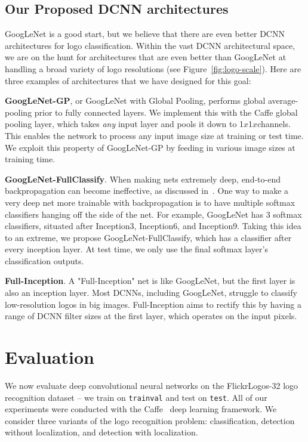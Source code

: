 \documentclass{bmvc2k}
\begin{document}
\subsection{Our Proposed DCNN architectures}
\vspace{-0.1in}
GoogLeNet is a good start, but we believe that there are even better DCNN architectures for logo classification.
Within the vast DCNN architectural space, we are on the hunt for architectures that are even better than GoogLeNet at handling a broad variety of logo resolutions (see Figure~\ref{fig:logo-scale}).
Here are three examples of architectures that we have designed for this goal:

{\bf GoogLeNet-GP}, or GoogLeNet with Global Pooling, performs global average-pooling prior to fully connected layers. 
We implement this with the Caffe global pooling layer, which takes {\em any} input layer and pools it down to 1$x$1$x$channels.
This enables the network to process any input image size at training or test time.
We exploit this property of GoogLeNet-GP by feeding in various image sizes at training time.


{\bf GoogLeNet-FullClassify}. 
When making nets extremely deep, end-to-end backpropagation can become ineffective, as discussed in~\cite{VGG-19}.
One way to make a very deep net more trainable with backpropagation is to have multiple softmax classifiers hanging off the side of the net.
For example, GoogLeNet has 3 softmax classifiers, situated after Inception3, Inception6, and Inception9.
Taking this idea to an extreme, we propose GoogLeNet-FullClassify, which has a classifier after every inception layer.
At test time, we only use the final softmax layer's classification outputs.

{\bf Full-Inception}. 
A "Full-Inception" net is like GoogLeNet, but the first layer is also an inception layer.
Most DCNNs, including GoogLeNet, struggle to classify low-resolution logos in big images.
Full-Inception aims to rectify this by having a range of DCNN filter sizes at the first layer, which operates on the input pixels.

\section{Evaluation}
\vspace{-0.1in}
\label{sec:eval}

We now evaluate deep convolutional neural networks on the FlickrLogos-32 logo recognition dataset -- we train on {\tt trainval} and test on {\tt test}. 
All of our experiments were conducted with the Caffe~\cite{jia2014caffe} deep learning framework. 
We consider three variants of the logo recognition problem: classification, detection without localization, and detection with localization.
\end{document}
